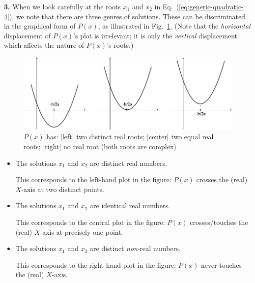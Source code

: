 {\bf 3.}
When we look carefully at the roots $x_1$ and $x_2$ in Eq.~(\ref{eq:generic-quadratic-4}), we note that there are three genres of solutions.  These can be discriminated in the graphical form of $P(x)$, as illustrated in Fig.~\ref{fig:SecondDegreeInit}.  (Note that the {\em horizontal} displacement of $P(x)$'s plot is irrelevant; it is only the {\em vertical} displacement which affects the nature of $P(x)$'s roots.)
\begin{figure}[htb]
\begin{center}
       \includegraphics[scale=0.325]{FiguresArithmetic/SecondDegreeInit}
\caption{$P(x)$ has: [left] two distinct real roots; [center] two equal real roots; [right] no real root (both roots are complex)}
\label{fig:SecondDegreeInit}
\end{center}
\end{figure}
\begin{itemize}
\item
The solutions $x_1$ and $x_2$ are distinct real numbers.

\smallskip

This corresponds to the left-hand plot in the figure: $P(x)$ crosses the (real) $X$-axis at two distinct points.

\medskip\item
The solutions $x_1$ and $x_2$ are identical real numbers.

\smallskip

This corresponds to the central plot in the figure: $P(x)$ crosses/touches the (real) $X$-axis at precisely one point.

\medskip\item
The solutions $x_1$ and $x_2$ are distinct {\em non}-real numbers.

\smallskip

This corresponds to the right-hand plot in the figure: $P(x)$ never touches the (real) $X$-axis.
\end{itemize}

